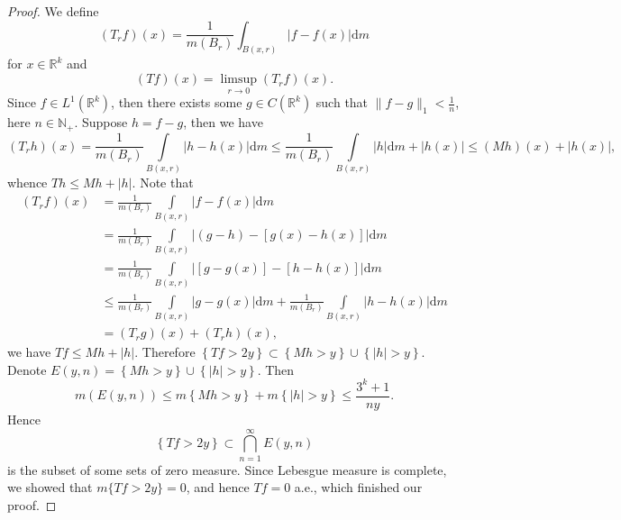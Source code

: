 \begin{proof}
We define 
$$
\left( T_rf \right) \left( x \right) =\frac{1}{m\left( B_r \right)}\int_{B\left( x,r \right)}{\left| f-f\left( x \right) \right|\mathrm{d}m}
$$
for $x\in\mathbb{R}^k$ and 
$$
\left( Tf \right) \left( x \right) =\mathop {\lim\mathrm{sup}} \limits_{r\rightarrow 0}\left( T_rf \right) \left( x \right) .
$$
Since $f\in L^1(\mathbb{R}^k)$, then there exists some $g\in C(\mathbb{R}^k)$ such that $\|f-g\|_1<\frac{1}{n}$, here $n\in\mathbb{N}_+$. Suppose $h=f-g$, then we have 
$$
\left( T_rh \right) \left( x \right) =\frac{1}{m\left( B_r \right)}\int\limits_{B\left( x,r \right)}{\left| h-h\left( x \right) \right|\mathrm{d}m}\le \frac{1}{m\left( B_r \right)}\int\limits_{B\left( x,r \right)}{\left| h \right|\mathrm{d}m}+\left| h\left( x \right) \right|\le \left( Mh \right) \left( x \right) +\left| h\left( x \right) \right|,
$$
whence $Th\le Mh+|h|$. Note that 
$$
\begin{aligned}
\left( T_rf \right) \left( x \right) &=\frac{1}{m\left( B_r \right)}\int\limits_{B\left( x,r \right)}{\left| f-f\left( x \right) \right|\mathrm{d}m}
\\
&=\frac{1}{m\left( B_r \right)}\int\limits_{B\left( x,r \right)}{\left| \left( g-h \right) -\left[ g\left( x \right) -h\left( x \right) \right] \right|\mathrm{d}m}
\\
&=\frac{1}{m\left( B_r \right)}\int\limits_{B\left( x,r \right)}{\left| \left[ g-g\left( x \right) \right] -\left[ h-h\left( x \right) \right] \right|\mathrm{d}m}
\\
&\le \frac{1}{m\left( B_r \right)}\int\limits_{B\left( x,r \right)}{\left| g-g\left( x \right) \right|\mathrm{d}m}+\frac{1}{m\left( B_r \right)}\int\limits_{B\left( x,r \right)}{\left| h-h\left( x \right) \right|\mathrm{d}m}
\\
&=\left( T_rg \right) \left( x \right) +\left( T_rh \right) \left( x \right) ,
\end{aligned}
$$
we have $Tf\le Mh+|h|$. Therefore $\left\{ Tf>2y \right\} \subset \left\{ Mh>y \right\} \cup \left\{ \left| h \right|>y \right\} $. Denote $E\left( y,n \right) =\left\{ Mh>y \right\} \cup \left\{ \left| h \right|>y \right\} $. Then 
$$
m\left( E\left( y,n \right) \right) \le m\left\{ Mh>y \right\} +m\left\{ \left| h \right|>y \right\} \le \frac{3^k+1}{ny}.
$$
Hence 
$$
\left\{ Tf>2y \right\} \subset \bigcap_{n=1}^{\infty}{E\left( y,n \right)}
$$
is the subset of some sets of zero measure. Since Lebesgue measure is complete, we showed that $m\{Tf>2y\}=0$, and hence $Tf=0$ a.e., which finished our proof.
\end{proof}
